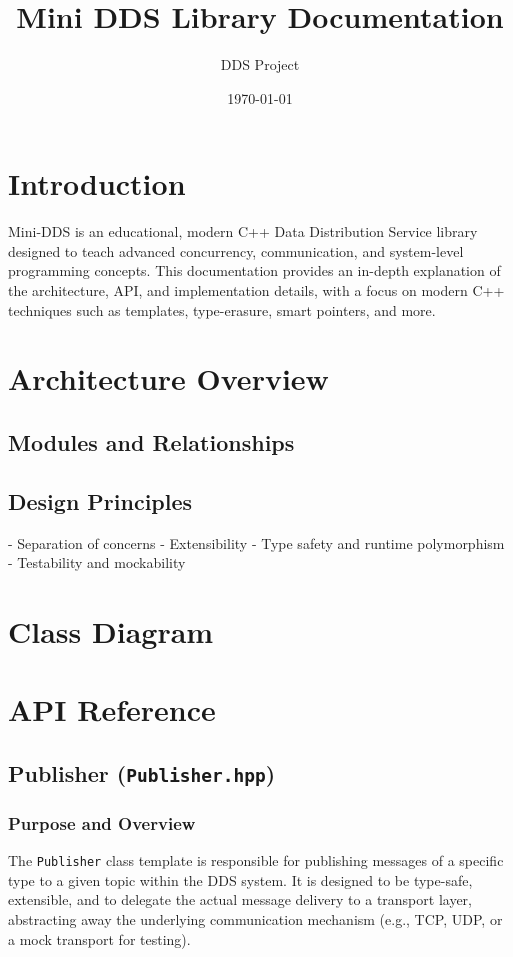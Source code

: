 \documentclass[12pt]{report}
\title{Mini DDS Library Documentation}
\author{DDS Project}
\date{\today}
\begin{document}
\maketitle
\tableofcontents

\chapter{Introduction}
Mini-DDS is an educational, modern C++ Data Distribution Service library designed to teach advanced concurrency, communication, and system-level programming concepts. This documentation provides an in-depth explanation of the architecture, API, and implementation details, with a focus on modern C++ techniques such as templates, type-erasure, smart pointers, and more.

\chapter{Architecture Overview}
\section{Modules and Relationships}

\section{Design Principles}
- Separation of concerns
- Extensibility
- Type safety and runtime polymorphism
- Testability and mockability

\chapter{Class Diagram}

\chapter{API Reference}

\section{Publisher (\texttt{Publisher.hpp})}

\subsection{Purpose and Overview}
The \texttt{Publisher} class template is responsible for publishing messages of a specific type to a given topic within the DDS system. It is designed to be type-safe, extensible, and to delegate the actual message delivery to a transport layer, abstracting away the underlying communication mechanism (e.g., TCP, UDP, or a mock transport for testing).
\end{document}
